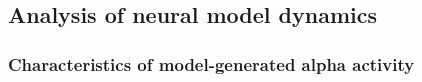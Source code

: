 \documentclass[12pt,twoside]{article}
\begin{document}
\subsection{Analysis of neural model dynamics}

\subsubsection{Characteristics of model-generated alpha activity}





\end{document}
